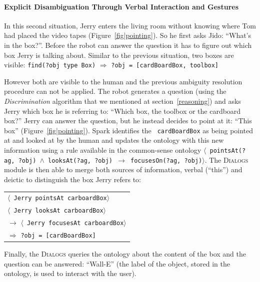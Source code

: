 \documentclass[preprint,3p,times]{elsarticle}
\newcommand{\concept}[1]{{\small \texttt{#1}}}
\newcommand{\stmt}[1]{{\footnotesize \tt $\langle$ #1\relax$\rangle$}}
\begin{document}
\paragraph{Explicit Disambiguation Through Verbal Interaction and Gestures}

In this second situation, Jerry enters the living room without knowing where Tom had
placed the video tapes (Figure~\ref{fig|pointing}). So he first asks Jido:
``What's in the box?''. Before the robot can answer the question it has to
figure out which box Jerry is talking about. Similar to the previous situation,
two boxes are visible: \concept{find(?obj type Box)} $\Rightarrow$ \concept{?obj = [cardBoardBox, toolbox]}

However both are visible to the human and the previous ambiguity resolution
procedure can not be applied. The robot generates a question (using the
\emph{Discrimination} algorithm that we mentioned at section~\ref{reasoning})
and asks Jerry which box he is referring to: ``Which box, the toolbox or the
cardboard box?'' Jerry can answer the question, but he instead decides to point
at it: ``This box'' (Figure~\ref{fig|pointing}). {\sc Spark} identifies the {\tt
cardBoardBox} as being pointed at and looked at by the human and updates the
ontology with this new information using a rule available in the common-sense
ontology \stmt{pointsAt(?ag, ?obj) $\land$ looksAt(?ag, ?obj) $\to$
focusesOn(?ag, ?obj)}. The \textsc{Dialogs} module is then able to merge both
sources of information, verbal (``this'') and deictic to distinguish the box
Jerry refers to:

\begin{center} 
    \begin{tabular}{l} 
        \stmt{Jerry pointsAt carboardBox}\\ 
        \stmt{Jerry looksAt carboardBox}\\ 
        $\to$ \stmt{Jerry focusesAt carboardBox}\\ 
        \hspace{0.7cm}$\Rightarrow$ {\tt ?obj = [cardBoardBox]}
    \end{tabular} 
\end{center}

Finally, the \textsc{Dialogs} queries the ontology about the content of the box
and the question can be answered: ``Wall-E'' (the label of the object, stored in the
ontology, is used to interact with the user).

\end{document}
